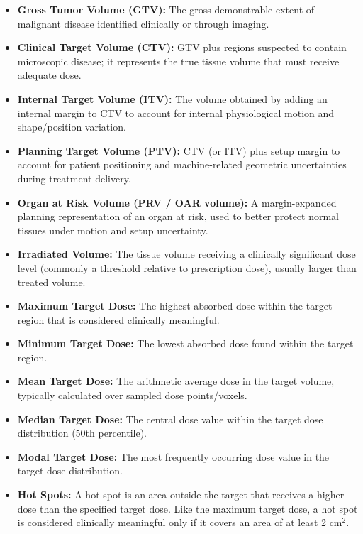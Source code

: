 \begin{itemize}
    \item \textbf{Gross Tumor Volume (GTV):} The gross demonstrable extent of malignant disease identified clinically or through imaging.
    \item \textbf{Clinical Target Volume (CTV):} GTV plus regions suspected to contain microscopic disease; it represents the true tissue volume that must receive adequate dose.
    \item \textbf{Internal Target Volume (ITV):} The volume obtained by adding an internal margin to CTV to account for internal physiological motion and shape/position variation.
    \item \textbf{Planning Target Volume (PTV):} CTV (or ITV) plus setup margin to account for patient positioning and machine-related geometric uncertainties during treatment delivery.
    \item \textbf{Organ at Risk Volume (PRV / OAR volume):} A margin-expanded planning representation of an organ at risk, used to better protect normal tissues under motion and setup uncertainty.
    
    \item \textbf{Irradiated Volume:} The tissue volume receiving a clinically significant dose level (commonly a threshold relative to prescription dose), usually larger than treated volume.
    \item \textbf{Maximum Target Dose:} The highest absorbed dose within the target region that is considered clinically meaningful.
    \item \textbf{Minimum Target Dose:} The lowest absorbed dose found within the target region.
    \item \textbf{Mean Target Dose:} The arithmetic average dose in the target volume, typically calculated over sampled dose points/voxels.
    \item \textbf{Median Target Dose:} The central dose value within the target dose distribution (50th percentile).
    \item \textbf{Modal Target Dose:} The most frequently occurring dose value in the target dose distribution.
    \item \textbf{Hot Spots:} A hot spot is an area outside the target that receives a higher dose than the specified target dose. Like the maximum target dose, a hot spot is considered clinically meaningful only if it covers an area of at least 2 cm$^2$.
\end{itemize}

